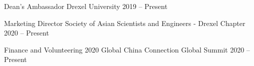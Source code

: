 
\begin{cvhonors}

  \cvhonor
  {Dean's Ambassador} %
  {Drexel University} %
  {2019 -- Present} %

  \cvhonor
  {Marketing Director} %
  {Society of Asian Scientists and Engineers - Drexel Chapter} %
  {2020 -- Present} %

  \cvhonor
  {Finance and Volunteering} %
  {2020 Global China Connection Global Summit} %
  {2020 -- Present} %

\end{cvhonors}
